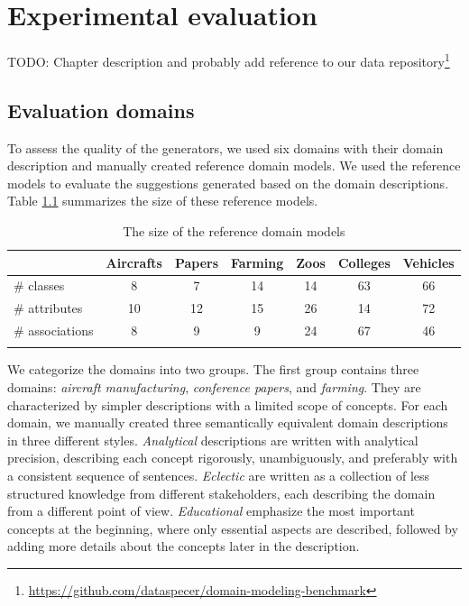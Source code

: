 \chapter{Experimental evaluation}

\noindent{}TODO: Chapter description and probably add reference to our data repository\footnote{\url{https://github.com/dataspecer/domain-modeling-benchmark}}


\section{Evaluation domains}

To assess the quality of the generators, we used six domains with their domain description and manually created reference domain models.
We used the reference models to evaluate the suggestions generated based on the domain descriptions.
Table \ref{tab:reference-model-size} summarizes the size of these reference models.

\begin{table}[!h]
    \scriptsize
    \centering
    \setlength{\tabcolsep}{0.5em}
    \begin{tabular}{lcccccc}
         & Aircrafts & Papers & Farming & Zoos & Colleges & Vehicles \\
    \toprule
    \addlinespace
         \# classes      & 8  & 7  & 14 & 14 & 63 & 66 \\
         \# attributes   & 10 & 12 & 15 & 26 & 14 & 72 \\
         \# associations & 8  & 9  & 9  & 24 & 67 & 46 \\
    \addlinespace
    \bottomrule
    \addlinespace
    \end{tabular}
    \caption{The size of the reference domain models}
    \label{tab:reference-model-size}
\end{table}


We categorize the domains into two groups.
The first group contains three domains: \emph{aircraft manufacturing}, \emph{conference papers}, and \emph{farming}.
They are characterized by simpler descriptions with a limited scope of concepts.
For each domain, we manually created three semantically equivalent domain descriptions in three different styles.
\emph{Analytical} descriptions are written with analytical precision, describing each concept rigorously, unambiguously, and preferably with a consistent sequence of sentences.
\emph{Eclectic} are written as a collection of less structured knowledge from different stakeholders, each describing the domain from a different point of view.
\emph{Educational} emphasize the most important concepts at the beginning, where only essential aspects are described, followed by adding more details about the concepts later in the description.

